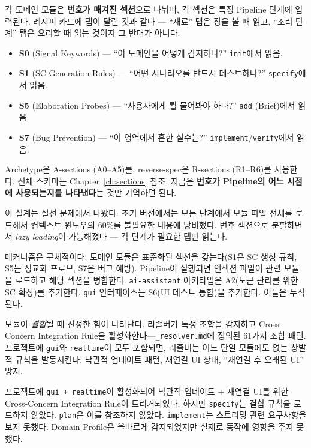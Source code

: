 \documentclass[11pt,a4paper,openright,twoside]{report}
\newcommand{\file}[1]{\texttt{#1}}
\begin{document}
\begin{tipbox}
각 도메인 모듈은 \textbf{번호가 매겨진 섹션}으로 나뉘며, 각 섹션은 특정 Pipeline 단계에 입력된다. 레시피 카드에 탭이 달린 것과 같다 --- ``재료'' 탭은 장을 볼 때 읽고, ``조리 단계'' 탭은 요리할 때 읽는 것이지 그 반대가 아니다.

\begin{itemize}
  \item \textbf{S0} (Signal Keywords) --- ``이 도메인을 어떻게 감지하나?'' \texttt{init}에서 읽음.
  \item \textbf{S1} (SC Generation Rules) --- ``어떤 시나리오를 반드시 테스트하나?'' \texttt{specify}에서 읽음.
  \item \textbf{S5} (Elaboration Probes) --- ``사용자에게 뭘 물어봐야 하나?'' \texttt{add} (Brief)에서 읽음.
  \item \textbf{S7} (Bug Prevention) --- ``이 영역에서 흔한 실수는?'' \texttt{implement}/\texttt{verify}에서 읽음.
\end{itemize}

Archetype은 A-sections (A0--A5)를, reverse-spec은 R-sections (R1--R6)를 사용한다. 전체 스키마는 Chapter~\ref{ch:sections} 참조. 지금은 \textbf{번호가 Pipeline의 어느 시점에 사용되는지를 나타낸다}는 것만 기억하면 된다.

이 설계는 실전 문제에서 나왔다: 초기 버전에서는 모든 단계에서 모듈 파일 전체를 로드해서 컨텍스트 윈도우의 60\%를 불필요한 내용에 낭비했다. 번호 섹션으로 분할하면서 \emph{lazy loading}이 가능해졌다 --- 각 단계가 필요한 탭만 읽는다.
\end{tipbox}

메커니즘은 구체적이다: 도메인 모듈은 표준화된 섹션을 갖는다(S1은 SC 생성 규칙, S5는 정교화 프로브, S7은 버그 예방). Pipeline이 실행되면 인젝션 파일이 관련 모듈을 로드하고 해당 섹션을 병합한다. \texttt{ai-assistant} 아키타입은 A2(토큰 관리를 위한 SC 확장)를 추가한다. \texttt{gui} 인터페이스는 S6(UI 테스트 통합)을 추가한다. 이들은 누적된다.

모듈이 \emph{결합}될 때 진정한 힘이 나타난다. 리졸버가 특정 조합을 감지하고 Cross-Concern Integration Rule을 활성화한다---\file{\_resolver.md}에 정의된 61가지 조합 패턴. 프로젝트에 \texttt{gui}와 \texttt{realtime}이 모두 포함되면, 리졸버는 어느 단일 모듈에도 없는 창발적 규칙을 발동시킨다: 낙관적 업데이트 패턴, 재연결 UI 상태, ``재연결 후 오래된 UI'' 방지.

\begin{warnbox}[P1-a 없이 발생한 실패]
프로젝트에 \texttt{gui + realtime}이 활성화되어 낙관적 업데이트 + 재연결 UI를 위한 Cross-Concern Integration Rule이 트리거되었다. 하지만 \texttt{specify}는 결합 규칙을 로드하지 않았다. \texttt{plan}은 이를 참조하지 않았다. \texttt{implement}는 스트리밍 관련 요구사항을 보지 못했다. Domain Profile은 올바르게 감지되었지만 실제로 동작에 영향을 주지 못했다.
\end{warnbox}
\end{document}
